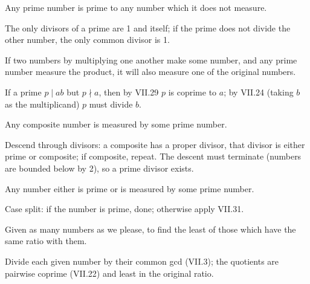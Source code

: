 \begin{claim}
\label{prop:VII.29}
Any prime number is prime to any number which it does not measure.
\end{claim}
\begin{evidence}
\label{ev:VII.29}
The only divisors of a prime are 1 and itself; if the prime does not
divide the other number, the only common divisor is 1.
\end{evidence}

\begin{claim}
\label{prop:VII.30}
If two numbers by multiplying one another make some number, and any
prime number measure the product, it will also measure one of the
original numbers.
\end{claim}
\begin{evidence}
\label{ev:VII.30}
If a prime $p \mid ab$ but $p \nmid a$, then by VII.29 $p$ is
coprime to $a$; by VII.24 (taking $b$ as the multiplicand) $p$ must
divide $b$.
\end{evidence}

\begin{claim}
\label{prop:VII.31}
Any composite number is measured by some prime number.
\end{claim}
\begin{evidence}
\label{ev:VII.31}
Descend through divisors: a composite has a proper divisor, that
divisor is either prime or composite; if composite, repeat.  The
descent must terminate (numbers are bounded below by 2), so a prime
divisor exists.
\end{evidence}

\begin{claim}
\label{prop:VII.32}
Any number either is prime or is measured by some prime number.
\end{claim}
\begin{evidence}
\label{ev:VII.32}
Case split: if the number is prime, done; otherwise apply VII.31.
\end{evidence}

\begin{claim}
\label{prop:VII.33}
Given as many numbers as we please, to find the least of those which
have the same ratio with them.
\end{claim}
\begin{evidence}
\label{ev:VII.33}
Divide each given number by their common gcd (VII.3); the quotients
are pairwise coprime (VII.22) and least in the original ratio.
\end{evidence}

